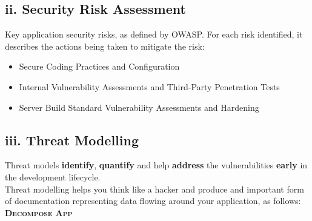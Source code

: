 \documentclass[a5paper,pagesize,10pt,bibtotoc,DIV=10,twoside]{scrbook}
\begin{document}
\subsection{\textbf{ii.} Security Risk Assessment}

Key application security risks, as defined by OWASP. For each risk identified, it describes the actions being taken to mitigate the risk:
\begin{itemize}
\item Secure Coding Practices and Configuration

\item Internal Vulnerability Assessments and Third-Party Penetration Tests
\item Server Build Standard Vulnerability Assessments and Hardening
\end{itemize}


\subsection{\textbf{iii.} Threat Modelling}

Threat models \textbf{identify}, \textbf{quantify} and help \textbf{address} the vulnerabilities \textbf{early} in the development lifecycle.\\

Threat modelling helps you think like a hacker and produce and important form of documentation representing data flowing around your application, as follows:\\




\textsc{\textbf{Decompose App}}\\
\end{document}
